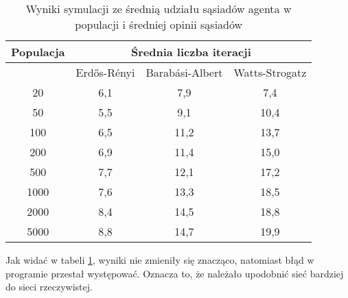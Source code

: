 \begin{table}[htbp]
    \centering
    \begin{tabular}{c|c|c|c}
        \hline
        Populacja & \multicolumn{3}{c}{Średnia liczba iteracji}                                    \\
        \hline
                  & Erdős-Rényi                                 & Barabási-Albert & Watts-Strogatz \\
        \hline
        20        & 6,1                                         & 7,9             & 7,4            \\
        50        & 5,5                                         & 9,1             & 10,4           \\
        100       & 6,5                                         & 11,2            & 13,7           \\
        200       & 6,9                                         & 11,4            & 15,0           \\
        500       & 7,7                                         & 12,1            & 17,2           \\
        1000      & 7,6                                         & 13,3            & 18,5           \\
        2000      & 8,4                                         & 14,5            & 18,8           \\
        5000      & 8,8                                         & 14,7            & 19,9           \\
    \end{tabular}
    \caption{Wyniki symulacji ze średnią udziału sąsiadów agenta w populacji i średniej opinii sąsiadów}
    \label{tab:results_with_mean_neighbour_population_share_and_neighbour_opinion_mean}
\end{table}

Jak widać w tabeli \ref{tab:results_with_mean_neighbour_population_share_and_neighbour_opinion_mean},
wyniki nie zmieniły się znacząco, natomiast błąd w programie przestał występować. Oznacza to, że należało upodobnić sieć bardziej do sieci rzeczywistej.
